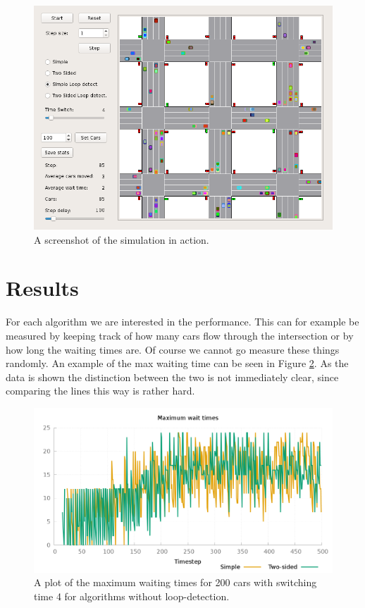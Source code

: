 \documentclass[a4paper,11pt]{article}
\begin{document}
\begin{figure}[H]
  \centering
  \includegraphics[width=.8\linewidth]{img/screenshot.png}
  \caption{A screenshot of the simulation in action.}
  \label{fig:screenshot}
\end{figure}


\section{Results}\label{sec:results}

For each algorithm we are interested in the performance.
This can for example be measured by keeping track of how many cars flow through the intersection or by how long the waiting times are.
Of course we cannot go measure these things randomly.
An example of the max waiting time can be seen in Figure \ref{fig:waittime}.
As the data is shown the distinction between the two is not immediately clear, since comparing the lines this way is rather hard.

\begin{figure}[H]
  \centering
  \includegraphics[width=.8\linewidth]{img/maxwait.png}
  \caption{A plot of the maximum waiting times for 200 cars with switching time 4 for algorithms without loop-detection.}
  \label{fig:waittime}
\end{figure}
\end{document}
